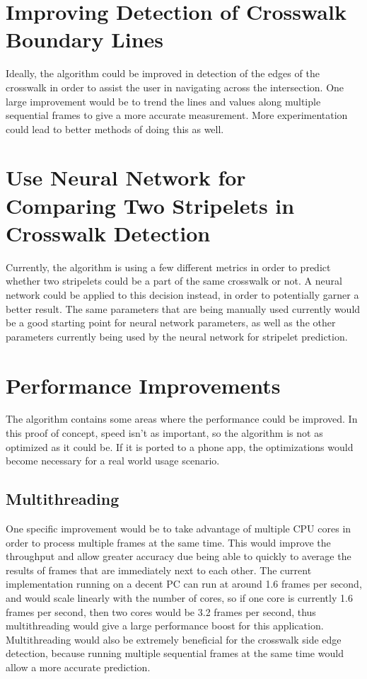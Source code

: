 \documentclass[12pt]{ucthesis}
\begin{document}
\section{Improving Detection of Crosswalk Boundary Lines}

Ideally, the algorithm could be improved in detection of the edges of the crosswalk in order to assist the user in navigating across the intersection. One large improvement would be to trend the lines and values along multiple sequential frames to give a more accurate measurement. More experimentation could lead to better methods of doing this as well. 

\section{Use Neural Network for Comparing Two Stripelets in Crosswalk Detection}

Currently, the algorithm is using a few different metrics in order to predict whether two stripelets could be a part of the same crosswalk or not. A neural network could be applied to this decision instead, in order to potentially garner a better result. The same parameters that are being manually used currently would be a good starting point for neural network parameters, as well as the other parameters currently being used by the neural network for stripelet prediction. 

\section{Performance Improvements}

The algorithm contains some areas where the performance could be improved. In this proof of concept, speed isn't as important, so the algorithm is not as optimized as it could be. If it is ported to a phone app, the optimizations would become necessary for a real world usage scenario.

\subsection{Multithreading}
One specific improvement would be to take advantage of multiple CPU cores in order to process multiple frames at the same time. This would improve the throughput and allow greater accuracy due being able to quickly to average the results of frames that are immediately next to each other.
The current implementation running on a decent PC can run at around 1.6 frames per second, and would scale linearly with the number of cores, so if one core is currently 1.6 frames per second, then two cores would be 3.2 frames per second, thus multithreading would give a large performance boost for this application. Multithreading would also be extremely beneficial for the crosswalk side edge detection, because running multiple sequential frames at the same time would allow a more accurate prediction.
\end{document}
